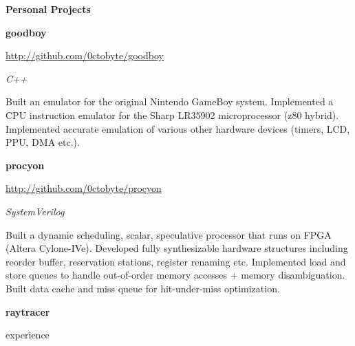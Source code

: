 \documentclass{article}
\newenvironment{name}{\fontfamily{phv}\selectfont\bfseries\normalsize}{\par}
\newenvironment{colorheading}{\fontfamily{phv}\selectfont\bfseries\normalsize\color{darkcyan}}{\par}
\newenvironment{genericbody}{\fontfamily{phv}\selectfont\small\raggedright}{\par}
\newenvironment{metadata}{\fontfamily{phv}\selectfont\itshape\small\color{darkgray}}{\par}
\newenvironment{itemizedbody}{\fontfamily{phv}\selectfont\small\begin{itemize}}{\end{itemize}\par}
\newenvironment{experience}[2]%
{%
  \begin{minipage}{0.6\linewidth}\begin{flushleft}#1\end{flushleft}\end{minipage}%
  \hfill%
  \begin{minipage}{0.3\linewidth}\begin{flushright}#2\end{flushright}\end{minipage}%
}%
{}
\newcommand{\lineitem}{\item[{$\to$}]}
\newcommand{\dotsep}{\begin{centering}\begin{colorheading}{$\bullet$}\end{colorheading}\end{centering}}
\begin{document}
\begin{minipage}[t]{0.6\linewidth}
    \smallskip
    \dotsep
    \smallskip
    \begin{name}Personal Projects\end{name}
    \smallskip
    \begin{experience}
    {
      \begin{colorheading}goodboy\end{colorheading}
      \begin{genericbody}\url{http://github.com/0ctobyte/goodboy}\end{genericbody}
    }
    {
      \begin{metadata}C++\end{metadata}
    }
    \end{experience}
    \begin{genericbody}
      Built an emulator for the original Nintendo GameBoy system. Implemented a CPU instruction emulator for the Sharp
      LR35902 microprocessor (z80 hybrid). Implemented accurate emulation of various other hardware devices (timers,
      LCD, PPU, DMA etc.).
    \end{genericbody}
    \medskip
    \begin{experience}
    {
      \begin{colorheading}procyon\end{colorheading}
      \begin{genericbody}\url{http://github.com/0ctobyte/procyon}\end{genericbody}
    }
    {
      \begin{metadata}SystemVerilog\end{metadata}
    }
    \end{experience}
    \begin{genericbody}
      Built a dynamic scheduling, scalar, speculative processor that runs on FPGA (Altera Cylone-IVe). Developed fully
      synthesizable hardware structures including reorder buffer, reservation stations, register renaming etc.
      Implemented load and store queues to handle out-of-order memory accesses + memory disambiguation. Built data
      cache and miss queue for hit-under-miss optimization.
    \end{genericbody}
    \medskip
    \begin{experience}
    {
      \begin{colorheading}raytracer\end{colorheading}
}
\end{experience}
\end{minipage}
\end{document}
